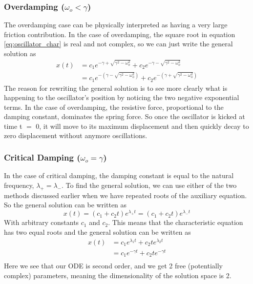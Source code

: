 \documentclass{article}
\newcommand{\be}{\begin{equation}}
\newcommand{\ee}{\end{equation}}
\begin{document}
\subsubsection*{Overdamping ($\omega_o < \gamma$)}
The overdamping case can be physically interpreted as having a very large friction contribution.
In the case of overdamping, the square root in equation \ref{eq:oscillator_char} is real and not complex, so we can just write the general solution as
\be
\begin{split}
x(t) &= c_1 e^{-\gamma + \sqrt{\gamma^2 - \omega_o^2}} + c_2 e^{-\gamma - \sqrt{\gamma^2 - \omega_o^2}} \\
&= c_1 e^{-(\gamma - \sqrt{\gamma^2 - \omega_o^2})} + c_2 e^{-(\gamma + \sqrt{\gamma^2 - \omega_o^2})}
\end{split}
\ee
The reason for rewriting the general solution is to see more clearly what is happening to the oscillator's position by noticing the two negative exponential terms.
In the case of overdamping, the resistive force, proportional to the damping constant, dominates the spring force.
So once the oscillator is kicked at time t $=$ 0, it will move to its maximum displacement and then quickly decay to zero displacement without anymore oscillations.

\subsubsection*{Critical Damping ($\omega_o = \gamma$)}
In the case of critical damping, the damping constant is equal to the natural frequency, $\lambda_+ = \lambda_-$.
To find the general solution, we can use either of the two methods discussed earlier when we have repeated roots of the auxiliary equation.
So the general solution can be written as
\be
x(t) = (c_1 + c_2t)e^{\lambda_+ t} = (c_1 + c_2t)e^{\lambda_- t}
\ee
With arbitrary constants $c_1$ and $c_2$.
This means that the characteristic equation has two equal roots and the general solution can be written as
\be
\begin{split}
x(t) &= c_1 e^{\lambda_1 t} + c_2 te^{\lambda_2 t}\\
&= c_1 e^{-\gamma t} + c_2 te^{-\gamma t}\\
\end{split}
\ee
Here we see that our ODE is second order, and we get 2 free (potentially complex) parameters, meaning the dimensionality of the solution space is 2.
\end{document}
